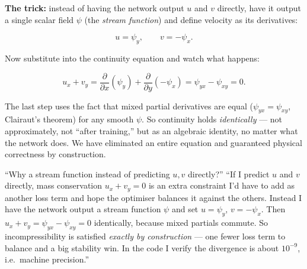 \documentclass[11pt,a4paper]{article}
\newcommand{\pd}[2]{\frac{\partial #1}{\partial #2}}
\begin{document}
\textbf{The trick:} instead of having the network output $u$ and $v$ directly,
have it output a single scalar field $\psi$ (the \emph{stream function}) and
define velocity as its derivatives:

\begin{equation}
u = \psi_y, \qquad v = -\psi_x.
\label{eq:stream-def}
\end{equation}

Now substitute into the continuity equation and watch what happens:

\begin{equation}
u_x + v_y = \pd{}{x}(\psi_y) + \pd{}{y}(-\psi_x)
          = \psi_{yx} - \psi_{xy} = 0.
\label{eq:continuity-exact}
\end{equation}

The last step uses the fact that mixed partial derivatives are equal
($\psi_{yx} = \psi_{xy}$, Clairaut's theorem) for any smooth $\psi$. So
continuity holds \emph{identically} --- not approximately, not ``after
training,'' but as an algebraic identity, no matter what the network does. We
have eliminated an entire equation and guaranteed physical correctness by
construction.

\begin{center}
\end{center}

\begin{defensebox}{``Why a stream function instead of predicting $u,v$ directly?''}
``If I predict $u$ and $v$ directly, mass conservation $u_x+v_y=0$ is an extra
constraint I'd have to add as another loss term and hope the optimiser balances
it against the others. Instead I have the network output a stream function
$\psi$ and set $u=\psi_y,\, v=-\psi_x$. Then $u_x+v_y = \psi_{yx}-\psi_{xy}=0$
identically, because mixed partials commute. So incompressibility is satisfied
\emph{exactly by construction} --- one fewer loss term to balance and a big
stability win. In the code I verify the divergence is about $10^{-9}$, i.e.\
machine precision.''
\end{defensebox}
\end{document}
